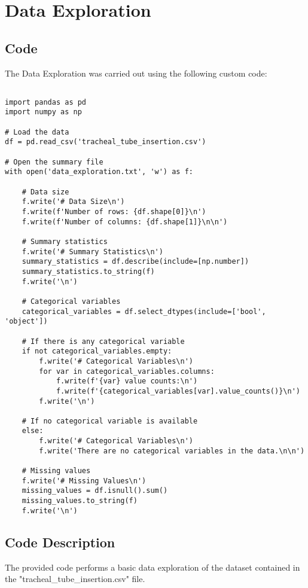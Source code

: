 \documentclass[11pt]{article}
\begin{document}
\section{Data Exploration}
\subsection{{Code}}
The Data Exploration was carried out using the following custom code:

\begin{verbatim}

import pandas as pd
import numpy as np

# Load the data
df = pd.read_csv('tracheal_tube_insertion.csv')

# Open the summary file
with open('data_exploration.txt', 'w') as f:

    # Data size
    f.write('# Data Size\n')
    f.write(f'Number of rows: {df.shape[0]}\n')
    f.write(f'Number of columns: {df.shape[1]}\n\n')

    # Summary statistics
    f.write('# Summary Statistics\n')
    summary_statistics = df.describe(include=[np.number])
    summary_statistics.to_string(f)
    f.write('\n')

    # Categorical variables
    categorical_variables = df.select_dtypes(include=['bool', 'object'])

    # If there is any categorical variable
    if not categorical_variables.empty:
        f.write('# Categorical Variables\n')
        for var in categorical_variables.columns:
            f.write(f'{var} value counts:\n')
            f.write(f'{categorical_variables[var].value_counts()}\n')
        f.write('\n')

    # If no categorical variable is available
    else:
        f.write('# Categorical Variables\n')
        f.write('There are no categorical variables in the data.\n\n')

    # Missing values
    f.write('# Missing Values\n')
    missing_values = df.isnull().sum()
    missing_values.to_string(f)
    f.write('\n')

\end{verbatim}

\subsection{Code Description}

The provided code performs a basic data exploration of the dataset contained in the "tracheal\_tube\_insertion.csv" file. 
\end{document}
